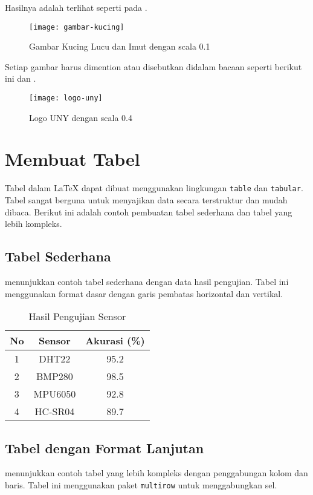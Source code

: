 Hasilnya adalah terlihat seperti pada .

\begin{figure}[H]
    \centering
    \texttt{[image: gambar-kucing]}
    \caption{Gambar Kucing Lucu dan Imut dengan scala 0.1}
    \label{fig:kucing-demo}
\end{figure}

Setiap gambar harus dimention atau disebutkan didalam bacaan seperti berikut ini  dan .

\begin{figure}[H]
    \centering
    \texttt{[image: logo-uny]}
    \caption{Logo UNY dengan scala 0.4}
    \label{fig:logoUNY}
\end{figure}

\section{Membuat Tabel}
Tabel dalam LaTeX dapat dibuat menggunakan lingkungan \texttt{table} dan \texttt{tabular}. Tabel sangat berguna untuk menyajikan data secara terstruktur dan mudah dibaca. Berikut ini adalah contoh pembuatan tabel sederhana dan tabel yang lebih kompleks.

\subsection{Tabel Sederhana}
 menunjukkan contoh tabel sederhana dengan data hasil pengujian. Tabel ini menggunakan format dasar dengan garis pembatas horizontal dan vertikal.

\begin{table}[H]
    \centering
    \caption{Hasil Pengujian Sensor}
    \label{tab:contoh-sederhana}
    \begin{tabular}{|c|c|c|}
        \hline
        \textbf{No} & \textbf{Sensor} & \textbf{Akurasi (\%)} \\
        \hline
        1 & DHT22 & 95.2 \\
        \hline
        2 & BMP280 & 98.5 \\
        \hline
        3 & MPU6050 & 92.8 \\
        \hline
        4 & HC-SR04 & 89.7 \\
        \hline
    \end{tabular}
\end{table}

\subsection{Tabel dengan Format Lanjutan}
 menunjukkan contoh tabel yang lebih kompleks dengan penggabungan kolom dan baris. Tabel ini menggunakan paket \texttt{multirow} untuk menggabungkan sel.


